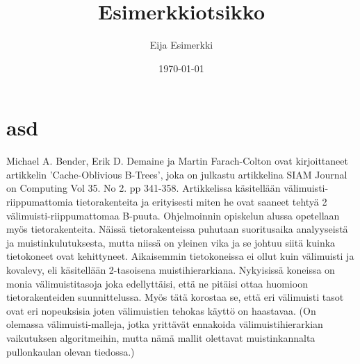 \documentclass[finnish]{tktltiki2}
\title{Esimerkkiotsikko}
\author{Eija Esimerkki}
\date{\today}
\theoremstyle{definition}
\theoremstyle{remark}
\begin{document}

\maketitle        %
\makeabstract     %

\newpage          %



\section{asd}


Michael A. Bender, Erik D. Demaine ja Martin Farach-Colton ovat kirjoittaneet artikkelin 'Cache-Oblivious B-Trees', joka on julkastu artikkelina SIAM Journal on Computing Vol 35. No 2. pp 341-358. Artikkelissa käsitellään välimuisti-riippumattomia tietorakenteita ja erityisesti miten he ovat saaneet tehtyä 2 välimuisti-riippumattomaa B-puuta.
  Ohjelmoinnin opiskelun alussa opetellaan myös tietorakenteita. Näissä tietorakenteissa puhutaan suoritusaika analyyseistä ja muistinkulutuksesta, mutta niissä on yleinen vika ja se johtuu siitä kuinka tietokoneet ovat kehittyneet. Aikaisemmin tietokoneissa ei ollut kuin välimuisti ja kovalevy, eli käsitellään 2-tasoisena muistihierarkiana. Nykyisissä koneissa on monia välimuistitasoja joka edellyttäisi, että ne pitäisi ottaa huomioon tietorakenteiden suunnittelussa. Myös tätä korostaa se, että eri välimuisti tasot ovat eri nopeuksisia joten välimuistien tehokas käyttö on haastavaa. (On olemassa välimuisti-malleja, jotka yrittävät ennakoida välimuistihierarkian vaikutuksen algoritmeihin, mutta nämä mallit olettavat muistinkannalta pullonkaulan olevan tiedossa.)
\end{document}
